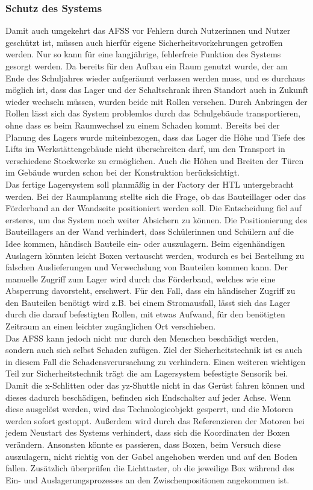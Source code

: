 \subsubsection{Schutz des Systems}
Damit auch umgekehrt das AFSS vor Fehlern durch Nutzerinnen und Nutzer geschützt ist, müssen auch hierfür eigene Sicherheitsvorkehrungen getroffen werden. Nur so kann für eine langjährige, fehlerfreie Funktion des Systems gesorgt werden.
Da bereits für den Aufbau ein Raum genutzt wurde, der am Ende des Schuljahres wieder aufgeräumt verlassen werden muss, und es durchaus möglich ist, dass das Lager und der Schaltschrank ihren Standort auch in Zukunft wieder wechseln müssen, wurden beide mit Rollen versehen. Durch Anbringen der Rollen lässt sich das System problemlos durch das Schulgebäude transportieren, ohne dass es beim Raumwechsel zu einem Schaden kommt. Bereits bei der Planung des Lagers wurde miteinbezogen, dass das Lager die Höhe und Tiefe des Lifts im Werkstättengebäude nicht überschreiten darf, um den Transport in verschiedene Stockwerke zu ermöglichen. Auch die Höhen und Breiten der Türen im Gebäude wurden schon bei der Konstruktion berücksichtigt.\\
Das fertige Lagersystem soll planmäßig in der Factory der HTL untergebracht werden. Bei der Raumplanung stellte sich die Frage, ob das Bauteillager oder das Förderband an der Wandseite positioniert werden soll. Die Entscheidung fiel auf ersteres, um das System noch weiter Absichern zu können. Die Positionierung des Bauteillagers an der Wand verhindert, dass Schülerinnen und Schülern auf die Idee kommen, händisch Bauteile ein- oder auszulagern. Beim eigenhändigen Auslagern könnten leicht Boxen vertauscht werden, wodurch es bei Bestellung zu falschen Auslieferungen und Verwechslung von Bauteilen kommen kann. Der manuelle Zugriff zum Lager wird durch das Förderband, welches wie eine Absperrung davorsteht, erschwert. Für den Fall, dass ein händischer Zugriff zu den Bauteilen benötigt wird z.B. bei einem Stromausfall, lässt sich das Lager durch die darauf befestigten Rollen, mit etwas Aufwand, für den benötigten Zeitraum an einen leichter zugänglichen Ort verschieben.\\
Das AFSS kann jedoch nicht nur durch den Menschen beschädigt werden, sondern auch sich selbst Schaden zufügen. Ziel der Sicherheitstechnik ist es auch in diesem Fall die Schadensverursachung zu verhindern. Einen weiteren wichtigen Teil zur Sicherheitstechnik trägt die am Lagersystem befestigte Sensorik bei. Damit die x-Schlitten oder das yz-Shuttle nicht in das Gerüst fahren können und dieses dadurch beschädigen, befinden sich Endschalter auf jeder Achse. Wenn diese ausgelöst werden, wird das Technologieobjekt gesperrt, und die Motoren werden sofort gestoppt. Außerdem wird durch das Referenzieren der Motoren bei jedem Neustart des Systems verhindert, dass sich die Koordinaten der Boxen verändern. Ansonsten könnte es passieren, dass Boxen, beim Versuch diese auszulagern, nicht richtig von der Gabel angehoben werden und auf den Boden fallen. Zusätzlich überprüfen die Lichttaster, ob die jeweilige Box während des Ein- und Auslagerungsprozesses an den Zwischenpositionen angekommen ist.\\

